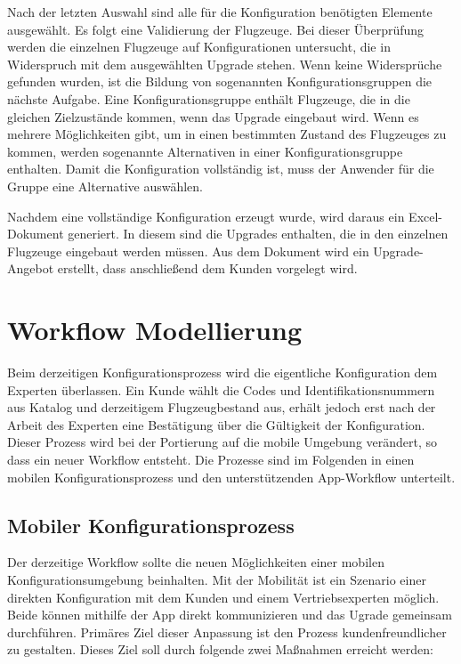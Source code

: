 Nach der letzten Auswahl sind alle für die Konfiguration benötigten Elemente ausgewählt. Es folgt eine Validierung der Flugzeuge. Bei dieser Überprüfung werden die einzelnen Flugzeuge auf Konfigurationen untersucht, die in Widerspruch mit dem ausgewählten Upgrade stehen. Wenn keine Widersprüche gefunden wurden, ist die Bildung von sogenannten Konfigurationsgruppen die nächste Aufgabe. Eine Konfigurationsgruppe enthält Flugzeuge, die in die gleichen Zielzustände kommen, wenn das Upgrade eingebaut wird. Wenn es mehrere Möglichkeiten gibt, um in einen bestimmten Zustand des Flugzeuges zu kommen, werden sogenannte Alternativen in einer Konfigurationsgruppe enthalten. Damit die Konfiguration vollständig ist, muss der Anwender für die Gruppe eine Alternative auswählen. \par

Nachdem eine vollständige Konfiguration erzeugt wurde, wird daraus ein Excel-Dokument generiert. In diesem sind die Upgrades enthalten, die in den einzelnen Flugzeuge eingebaut werden müssen. Aus dem Dokument wird ein Upgrade-Angebot erstellt, dass anschließend dem Kunden vorgelegt wird.

\section{Workflow Modellierung}
Beim derzeitigen Konfigurationsprozess wird die eigentliche Konfiguration dem Experten überlassen. Ein Kunde wählt die Codes und Identifikationsnummern aus Katalog und derzeitigem Flugzeugbestand aus, erhält jedoch erst nach der Arbeit des Experten eine Bestätigung über die Gültigkeit der Konfiguration. Dieser Prozess wird bei der Portierung auf die mobile Umgebung verändert, so dass ein neuer Workflow entsteht. Die Prozesse sind im Folgenden in einen mobilen Konfigurationsprozess und den unterstützenden App-Workflow unterteilt.
\subsection{Mobiler Konfigurationsprozess}
Der derzeitige Workflow sollte die neuen Möglichkeiten einer mobilen Konfigurationsumgebung beinhalten. Mit der Mobilität ist ein Szenario einer direkten Konfiguration mit dem Kunden und einem Vertriebsexperten möglich. Beide können mithilfe der App direkt kommunizieren und das Ugrade gemeinsam durchführen. 
Primäres Ziel dieser Anpassung ist den Prozess kundenfreundlicher zu gestalten. Dieses Ziel soll durch folgende zwei Maßnahmen erreicht werden: \par

